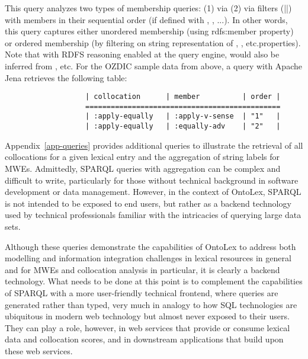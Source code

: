 \documentclass[output=paper,colorlinks,citecolor=brown]{langscibook}
\begin{document}
\noindent
    This query analyzes two types of membership queries: (1) via   (2) via filters (||) with members in their sequential order (if defined with , , ...). In other words, this query captures either unordered membership (using rdfs:member property)
or ordered membership (by filtering on string representation of , , etc.properties).
    Note that with RDFS reasoning enabled at the query engine,  would also be inferred from , etc.
For the OZDIC sample data from above, a query with Apache Jena retrieves the following table:

{\listingsize
\begin{verbatim}
                   | collocation      | member          | order |
                   ==============================================
                   | :apply-equally   | :apply-v-sense  | "1"   |
                   | :apply-equally   | :equally-adv    | "2"   |
\end{verbatim}
}

\noindent
Appendix~\ref{app-queries} provides  additional queries to illustrate the retrieval of all collocations for a given lexical entry and the aggregation of string labels for MWEs.
Admittedly, SPARQL queries with aggregation can be complex and difficult to write, particularly for those without technical background in software development or data management. However, in the context of OntoLex, SPARQL is not intended to be exposed to end users, but rather as a backend technology used by %
technical professionals %
familiar with the intricacies of querying large data sets. %


Although these queries demonstrate the capabilities of OntoLex to address both modelling and information integration challenges in lexical resources in general and for MWEs and collocation analysis in particular, it is clearly a backend technology. What needs to be done at this point is to complement the capabilities of SPARQL with a more user-friendly technical frontend, where queries are generated rather than typed, very much in analogy to how SQL technologies are ubiquitous in modern web technology but almost never exposed to their users.
They can play a role, however, in web services that provide or consume lexical data and collocation scores, and in downstream applications that build upon these web services.
\end{document}
